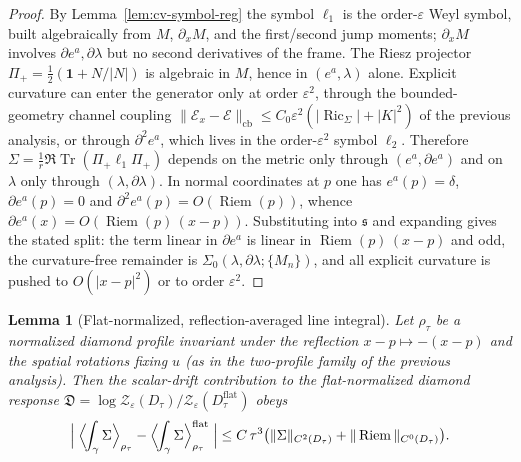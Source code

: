 \documentclass[11pt]{article}
\newtheorem{lemma}[theorem]{Lemma}
\theoremstyle{definition}
\theoremstyle{remark}
\newcommand{\eps}{\varepsilon}
\newcommand{\Tr}{\operatorname{Tr}}
\newcommand{\Ric}{\operatorname{Ric}}
\newcommand{\Riem}{\operatorname{Riem}}
\newcommand{\Pip}{\Pi_+}
\begin{document}
\begin{proof}
By Lemma~\ref{lem:cv-symbol-reg} the symbol $\ell_1$ is the order-$\eps$ Weyl symbol,
built algebraically from $M$, $\partial_x M$, and the first/second jump moments;
$\partial_x M$ involves $\partial e^a,\partial\lambda$ but no second derivatives of
the frame.  The Riesz projector $\Pip=\tfrac12(\mathbf1+N/|N|)$ is algebraic in
$M$, hence in $(e^a,\lambda)$ alone.  Explicit curvature can enter the generator
only at order $\eps^2$, through the bounded-geometry channel coupling
$\|\mathcal E_x-\mathcal E\|_{\mathrm{cb}}\le C_0\eps^2(|\Ric_\Sigma|+|K|^2)$ of the
previous analysis, or through $\partial^2 e^a$, which lives in the order-$\eps^2$ symbol
$\ell_2$.  Therefore $\Sigma=\tfrac1r\Re\Tr(\Pip\ell_1\Pip)$ depends on the metric
only through $(e^a,\partial e^a)$ and on $\lambda$ only through
$(\lambda,\partial\lambda)$.  In normal coordinates at $p$ one has $e^a(p)=\delta$,
$\partial e^a(p)=0$ and $\partial^2 e^a(p)=O(\Riem(p))$, whence
$\partial e^a(x)=O(\Riem(p)\,(x-p))$.  Substituting into $\mathfrak s$ and expanding
gives the stated split: the term linear in $\partial e^a$ is linear in
$\Riem(p)\,(x-p)$ and odd, the curvature-free remainder is
$\Sigma_0(\lambda,\partial\lambda;\{M_n\})$, and all explicit curvature is pushed to
$O(|x-p|^2)$ or to order $\eps^2$.
\end{proof}

\begin{lemma}[Flat-normalized, reflection-averaged line integral]
\label{lem:line-integral}
Let $\rho_\tau$ be a normalized diamond profile invariant under the reflection
$x-p\mapsto-(x-p)$ and the spatial rotations fixing $u$ \textup{(}as in the
two-profile family of the previous analysis\textup{)}.  Then the scalar-drift
contribution to the flat-normalized diamond response
$\mathfrak D=\log\mathcal Z_\eps(D_\tau)/\mathcal Z_\eps(D_\tau^{\mathrm{flat}})$
obeys
\[
 \Bigl|\;\Bigl\langle\!\int_\gamma\Sigma\Bigr\rangle_{\rho_\tau}
 -\Bigl\langle\!\int_\gamma\Sigma\Bigr\rangle^{\mathrm{flat}}_{\rho_\tau}\;\Bigr|
 \le C\,\tau^3\bigl(\|\Sigma\|_{C^2(D_\tau)}+\|\Riem\|_{C^0(D_\tau)}\bigr).
\]
\end{lemma}
\end{document}
